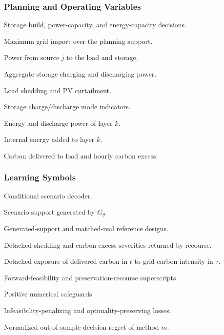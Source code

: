 \documentclass[times]{elsarticle}
\newenvironment{manuscriptdescription}
  {\begin{description}[style=multiline,leftmargin=4.8cm,labelwidth=4.5cm,align=left]}
  {\end{description}}
\begin{document}
\subsubsection*{Planning and Operating Variables}
\begin{manuscriptdescription}
\item[$u^{\mathrm{ES}},P^{\mathrm{ES}},E^{\mathrm{ES}}$] Storage build,
power-capacity, and energy-capacity decisions.
\item[$p^{\mathrm{pk}}$] Maximum grid import over the planning support.
\item[$p^{j,\mathrm L}_{s,t},p^{j,\mathrm{ES}}_{s,t}$] Power from source $j$
to the load and storage.
\item[$p^{\mathrm{ch}}_{s,t},p^{\mathrm{dc}}_{s,t}$] Aggregate storage charging and
discharging power.
\item[$p^{\mathrm{sh}}_{s,t},p^{\mathrm{cur}}_{s,t}$] Load shedding and PV curtailment.
\item[$u^{\mathrm{ch}}_{s,t},u^{\mathrm{dc}}_{s,t}$] Storage charge/discharge
mode indicators.
\item[$e_{s,k,t},p^{\mathrm{dc}}_{s,k,t}$] Energy and discharge power of layer $k$.
\item[$\Delta e^{\mathrm{in}}_{s,k,t}$] Internal energy added to layer $k$.
\item[$m^{\mathrm L}_{s,t},\varepsilon^{\mathrm{co2}}_{s,t}$] Carbon delivered to load and hourly carbon
excess.
\end{manuscriptdescription}

\subsubsection*{Learning Symbols}
\begin{manuscriptdescription}
\item[$G_\theta$] Conditional scenario decoder.
\item[$\widehat{\mathcal S}_\theta$] Scenario support generated by $G_\theta$.
\item[$\widehat{\bm y}_\theta,\bm y^{\star}$] Generated-support and matched-real
reference designs.
\item[$\delta^{\mathrm{sh}},\delta^{\mathrm{co2}}$] Detached shedding and carbon-excess
severities returned by recourse.
\item[$H_{n,t,\tau}$] Detached exposure of delivered carbon in $t$ to grid
carbon intensity in $\tau$.
\item[$F,P$] Forward-feasibility and preservation-recourse superscripts.
\item[$\epsilon_D,\epsilon_H,\epsilon_g,\epsilon_J$] Positive numerical safeguards.
\item[$L_{\mathrm{IPL}},L_{\mathrm{OPL}}$] Infeasibility-penalizing and
optimality-preserving losses.
\item[$\mathcal R_m$] Normalized out-of-sample decision regret of method $m$.
\end{manuscriptdescription}
\end{document}
